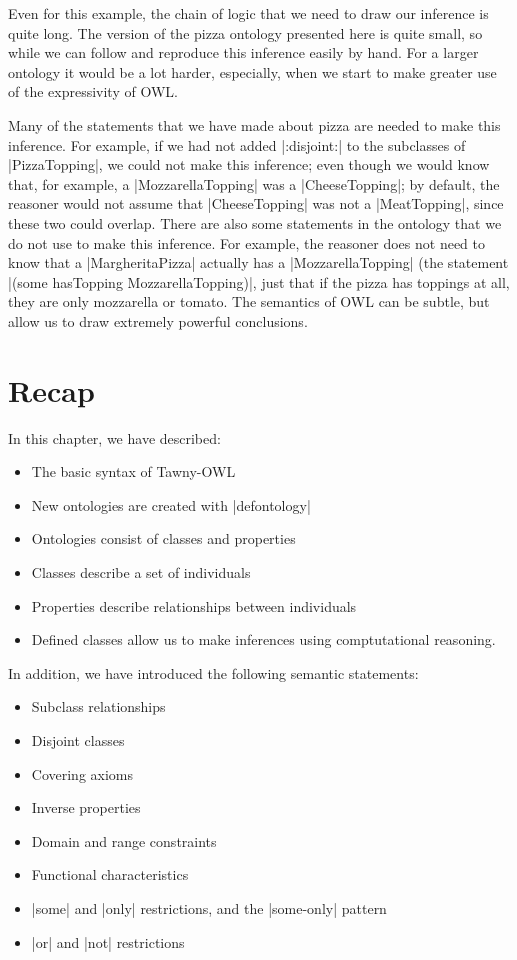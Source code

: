 Even for this example, the chain of logic that we need to draw our
inference is quite long. The version of the pizza ontology presented
here is quite small, so while we can follow and reproduce this
inference easily by hand. For a larger ontology it would be a lot
harder, especially, when we start to make greater use of the
expressivity of OWL.

Many of the statements that we have made about pizza are needed to make this
inference. For example, if we had not added |:disjoint:| to the subclasses of
|PizzaTopping|, we could not make this inference; even though we would know
that, for example, a |MozzarellaTopping| was a |CheeseTopping|; by default,
the reasoner would not assume that |CheeseTopping| was not a |MeatTopping|,
since these two could overlap. There are also some statements in the ontology
that we do not use to make this inference. For example, the reasoner does not
need to know that a |MargheritaPizza| actually has a |MozzarellaTopping| (the
statement |(some hasTopping MozzarellaTopping)|, just that if the pizza has
toppings at all, they are only mozzarella or tomato. The semantics of OWL can
be subtle, but allow us to draw extremely powerful conclusions.

\section{Recap}
\label{sec:recap-pizza}

In this chapter, we have described:

\begin{itemize}
\item The basic syntax of Tawny-OWL
\item New ontologies are created with |defontology|
\item Ontologies consist of classes and properties
\item Classes describe a set of individuals
\item Properties describe relationships between individuals
\item Defined classes allow us to make inferences using comptutational
  reasoning.
\end{itemize}

In addition, we have introduced the following semantic statements:
\begin{itemize}
\item Subclass relationships
\item Disjoint classes
\item Covering axioms
\item Inverse properties
\item Domain and range constraints
\item Functional characteristics
\item |some| and |only| restrictions, and the |some-only| pattern
\item |or| and |not| restrictions
\end{itemize}
